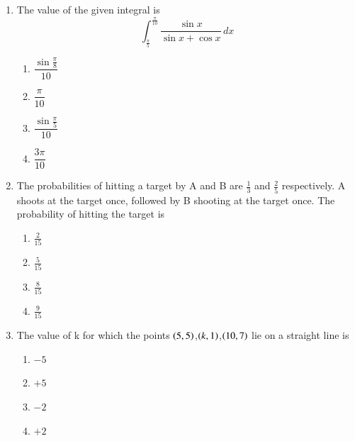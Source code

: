\documentclass[journal,12pt,onecolumn]{IEEEtran}
\theoremstyle{remark}
\begin{document}
\begin{enumerate}
\hfill{}
\begin{multicols}{4}
\begin{enumerate}
\item $1$ in $556$
\item $1$ in $785$
\item $1$ in $833$
\item $1$ in $1024$
\end{enumerate}
\end{multicols}

\item The value of the given integral is
\[
\int_{\frac{\pi}{5}}^{\frac{\pi}{10}} \frac{\sin x}{\sin x + \cos x} \, dx
\]

\hfill{}
\begin{multicols}{4}
\begin{enumerate}
\item $\dfrac{\sin \frac{\pi}{8}}{10}$
\item $\dfrac{\pi}{10}$
\item $\dfrac{\sin \frac{\pi}{5}}{10}$
\item $\dfrac{3\pi}{10}$
\end{enumerate}
\end{multicols}

\item  The probabilities of hitting a target by A and B are $\frac{1}{3}$ and $\frac{2}{5}$ respectively. A shoots at the target
once, followed by B shooting at the target once. The probability of hitting the target is

\hfill{}
\begin{multicols}{4}
\begin{enumerate}
\item $\frac{2}{15}$
\item $\frac{5}{15}$
\item $\frac{8}{15}$
\item $\frac{9}{15}$
\end{enumerate}
\end{multicols}

\item  The value of k for which the points $\left(5,5\right)$,$\left(k,1\right)$,$\left(10,7\right)$ lie on a straight line is

\hfill{}
\begin{multicols}{4}
\begin{enumerate}
\item $-5$
\item $+5$
\item $-2$
\item $+2$
\end{enumerate}
\end{multicols}


\end{enumerate}
\end{document}
